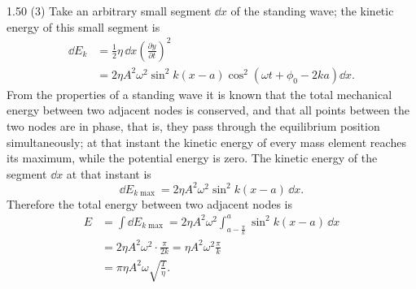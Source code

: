 \begin{solution}{1.50}
(3) Take an arbitrary small segment $\dd x$ of the standing wave; the kinetic energy of this small segment is
\[
\begin{aligned}
\dd E_k&=\frac{1}{2}\eta\,\dd x\left(\frac{\partial y}{\partial t}\right)^2\\
&=2\eta A^2\omega^2\sin^2k(x-a)\cos^2\left(\omega t+\phi_0-2ka\right)\dd x.
\end{aligned}
\]
From the properties of a standing wave it is known that the total mechanical energy between two adjacent nodes is conserved, and that all points between the two nodes are in phase, that is, they pass through the equilibrium position simultaneously; at that instant the kinetic energy of every mass element reaches its maximum, while the potential energy is zero. The kinetic energy of the segment $\dd x$ at that instant is
\[
\dd E_{k\max}=2\eta A^2\omega^2\sin^2k(x-a)\,\dd x.
\]
Therefore the total energy between two adjacent nodes is
\[
\begin{aligned}
E&=\int\dd E_{k\max}=2\eta A^2\omega^2\int_{a-\frac{\pi}{k}}^{a}\sin^2k(x-a)\,\dd x\\
&=2\eta A^2\omega^2\cdot\frac{\pi}{2k}=\eta A^2\omega^2\frac{\pi}{k}\\
&=\pi\eta A^2\omega\sqrt{\frac{T}{\eta}}.
\end{aligned}
\]
\end{solution}

